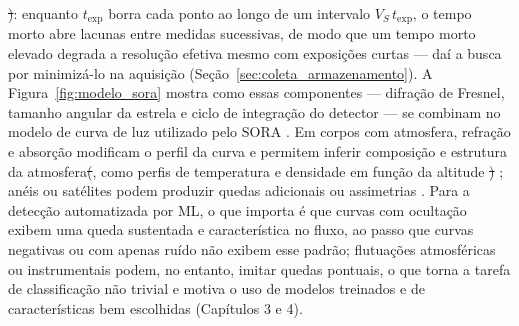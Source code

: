 \documentclass[msc]{on} %
\makeatletter
\providecommand{\DIFaddtex}[1]{{\protect\color{red}#1}} %
\providecommand{\DIFdeltex}[1]{{\protect\color{red}\sout{#1}}} %
\providecommand{\DIFaddbegin}{} %
\providecommand{\DIFaddend}{} %
\providecommand{\DIFdelbegin}{} %
\providecommand{\DIFdelend}{} %
\providecommand{\DIFadd}[1]{\texorpdfstring{\DIFaddtex{#1}}{#1}} %
\providecommand{\DIFdel}[1]{\texorpdfstring{\DIFdeltex{#1}}{}} %
\let\sout@orig\sout %
\renewcommand{\sout}[1]{\ifmmode\text{\sout@orig{\ensuremath{#1}}}\else\sout@orig{#1}\fi} %
\makeatother
\begin{document}
\DIFdel{)}\DIFdelend : enquanto \(t_{\mathrm{exp}}\) borra cada ponto ao longo de um intervalo \(V_S\,t_{\mathrm{exp}}\), o tempo morto abre lacunas entre medidas sucessivas, de modo que um tempo morto elevado degrada a resolução efetiva mesmo com exposições curtas --- daí a busca por minimizá-lo na aquisição (Seção~\ref{sec:coleta_armazenamento}). A Figura~\ref{fig:modelo_sora} mostra como essas componentes --- difração de Fresnel, tamanho angular da estrela e ciclo de integração do detector --- se combinam no modelo de curva de luz utilizado pelo SORA \citep{SORA2022}. Em corpos com atmosfera, refração e absorção modificam o perfil da curva e permitem inferir composição e estrutura da atmosfera\DIFdelbegin \DIFdel{(}\DIFdelend \DIFaddbegin \DIFadd{, como }\DIFaddend perfis de temperatura e densidade em função da altitude \DIFdelbegin \DIFdel{) }\DIFdelend \citep{Sicardy2016}; anéis ou satélites podem produzir quedas adicionais ou assimetrias \citep{BragaRibas2014}. Para a detecção automatizada por ML, o que importa é que curvas com ocultação exibem uma queda sustentada e característica no fluxo, ao passo que curvas negativas ou com apenas ruído não exibem esse padrão; flutuações atmosféricas ou instrumentais podem, no entanto, imitar quedas pontuais, o que torna a tarefa de classificação não trivial e motiva o uso de modelos treinados e de características bem escolhidas (Capítulos 3 e 4).
\end{document}
